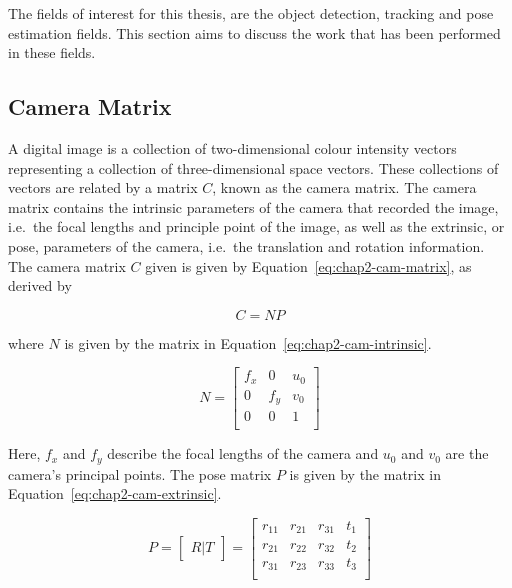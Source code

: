 The fields of interest for this thesis, are the object detection, tracking and pose estimation fields. This section aims to discuss the work that has been performed in these fields. 

\subsection{Camera Matrix}

A digital image is a collection of two-dimensional colour intensity vectors representing a collection of three-dimensional space vectors. These collections of vectors are related by a matrix $C$, known as the camera matrix. The camera matrix contains the intrinsic parameters of the camera that recorded the image, i.e.\ the focal lengths and principle point of the image, as well as the extrinsic, or pose, parameters of the camera, i.e.\ the translation and rotation information. The camera matrix $C$ given is given by Equation~\ref{eq:chap2-cam-matrix}, as derived by~\cite{heikkila1997four}

\begin{equation}
  \label{eq:chap2-cam-matrix}
  C = 
  NP
\end{equation}

where $N$ is given by the matrix in Equation~\ref{eq:chap2-cam-intrinsic}.

\begin{equation}
  \label{eq:chap2-cam-intrinsic}
  N = 
  \begin{bmatrix}
    f_x & 0   & u_0 \\
    0   & f_y & v_0 \\
    0   & 0   & 1   \\
  \end{bmatrix}
\end{equation}

Here, $f_x$ and $f_y$ describe the focal lengths of the camera and $u_0$ and $v_0$ are the camera's principal points. The pose matrix $P$ is given by the matrix in Equation~\ref{eq:chap2-cam-extrinsic}.

\begin{equation}
  \label{eq:chap2-cam-extrinsic}
  P = 
  \begin{bmatrix}
    R | T
  \end{bmatrix}
  =
  \begin{bmatrix}
    r_{11} & r_{21} & r_{31} & t_1 \\
    r_{21} & r_{22} & r_{32} & t_2 \\
    r_{31} & r_{23} & r_{33} & t_3 \\
  \end{bmatrix}
\end{equation}

